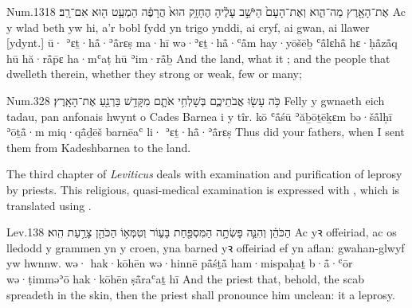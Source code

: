 \begin{example}{Num.}{13}{18}{}{}
	\quoling
	{ אֶת־הָאָ֖רֶץ מַה־הִ֑וא וְאֶת־הָעָם֙ הַיֹּשֵׁ֣ב עָלֶ֔יהָ הֶחָזָ֥ק הוּא֙ הֲרָפֶ֔ה הַמְעַ֥ט ה֖וּא אִם־רָֽב׃}
	{Ac  y wlad beth yw hi, a’r bobl ſydd yn trigo ynddi, ai cryf, ai gwan, ai llawer [ydynt.]}
	{ū· ʾɛṯ·hå̄·ʾå̄rɛṣ ma·hī wə·ʾɛṯ·hå̄·ʿå̄m hay·yōšēḇ ʿå̄lɛhå̄ hɛ·ḥå̄zå̄q hū hă·rå̄p̄ɛ ha·mʿaṭ hū ʾim·rå̄ḇ}
	{And  the land, what it ; and the people that dwelleth therein, whether they  strong or weak, few or many;}
\end{example}

\begin{example}{Num.}{32}{8}{}{}
	\quoling
	{כֹּ֥ה עָשׂ֖וּ אֲבֹתֵיכֶ֑ם בְּשָׁלְחִ֥י אֹתָ֛ם מִקָּדֵ֥שׁ בַּרְנֵ֖עַ  אֶת־הָאָֽרֶץ׃}
	{Felly y gwnaeth eich tadau, pan anfonais hwynt o Cades Barnea i  y tîr.}
	{kō ʿå̄śū ʾăḇōṯēḵɛm bə·šå̄lḥī ʾōṯå̄·m miq·qå̄ḏēš barnēaʿ li· ʾɛṯ·hå̄·ʾå̄rɛṣ}
	{Thus did your fathers, when I sent them from Kadeshbarnea to  the land.}
\end{example}




\begin{paper}
	The third chapter of \emph{Leviticus} deals with examination and purification of leprosy by priests. This religious, quasi-medical examination is expressed with , which is translated using .
\end{paper}

\begin{example}{Lev.}{13}{8}{}{}
	\quoling
	{ הַכֹּהֵ֔ן וְהִנֵּ֛ה פָּשְׂתָ֥ה הַמִּסְפַּ֖חַת בָּע֑וֹר וְטִמְּא֥וֹ הַכֹּהֵ֖ן צָרַ֥עַת הִֽוא׃}
	{Ac  yꝛ offeiriad, ac os lledodd y grammen yn y croen, yna barned yꝛ offeiriad ef yn aflan: gwahan-glwyf yw hwnnw.}
	{wə· hak·kōhēn wə·hinnē på̄śṯå̄ ham·mispaḥaṯ b·å̄·ʿōr wə·ṭimməʾō hak·kōhēn ṣå̄raʿaṯ hī}
	{And  the priest  that, behold, the scab spreadeth in the skin, then the priest shall pronounce him unclean: it  a leprosy.}
\end{example}







